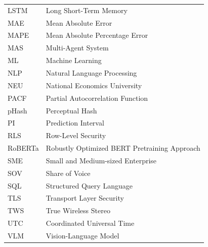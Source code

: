 \begin{center}
\begin{longtable}{p{3.2cm}p{10.6cm}}
  LSTM     & Long Short-Term Memory \\
  MAE      & Mean Absolute Error \\
  MAPE     & Mean Absolute Percentage Error \\
  MAS      & Multi-Agent System \\
  ML       & Machine Learning \\
  NLP      & Natural Language Processing \\
  NEU      & National Economics University \\
  PACF     & Partial Autocorrelation Function \\
  pHash    & Perceptual Hash \\
  PI       & Prediction Interval \\
  RLS      & Row-Level Security \\
  RoBERTa  & Robustly Optimized BERT Pretraining Approach \\
  SME      & Small and Medium-sized Enterprise \\
  SOV      & Share of Voice \\
  SQL      & Structured Query Language \\
  TLS      & Transport Layer Security \\
  TWS      & True Wireless Stereo \\
  UTC      & Coordinated Universal Time \\
  VLM      & Vision-Language Model \\
\end{longtable}
\end{center}
